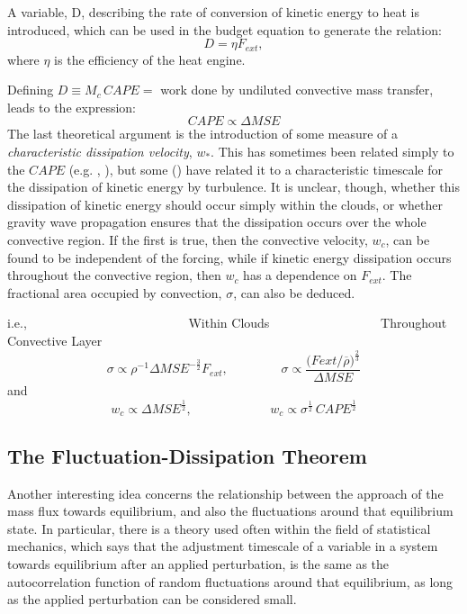 \documentclass[11pt,a4paper]{article}
\begin{document}
A variable, D, describing the rate of conversion of kinetic energy to
heat is introduced, which can be used in the budget equation to
generate the relation:
\begin{equation}
D = \eta F_{ext},
\end{equation}
where $\eta$ is the efficiency of the heat engine. 

Defining $D \equiv M_c \,CAPE = $ work done by undiluted convective mass
transfer, leads to the expression:
\begin{equation}
CAPE \propto \Delta MSE
\end{equation}  
The last theoretical argument is the introduction of some measure of a
\textit{characteristic dissipation velocity}, $w_*$. This has
sometimes been related simply to the $CAPE$ (e.g. \cite{craig}, \cite{emanuel}), but
some (\cite{shutts}) have related it to a characteristic timescale for the dissipation
of kinetic energy by turbulence. It is unclear, though,
whether this dissipation of kinetic energy should occur simply within
the clouds, or whether gravity wave propagation ensures that the
dissipation occurs over the whole convective region. If the first is
true, then the convective velocity, $w_c$, can be found to be independent of the forcing, while
if kinetic energy dissipation occurs throughout the convective region,
then $w_c$ has a dependence on $F_{ext}$. The fractional area occupied
by convection,
$\sigma$, can also be deduced. 

i.e., \ \ \ \ \ \ \ \ \ \ \ \ \ \ \ \ \ \ \ \ \ \ \ \ \ Within Clouds \ \
\ \ \ \ \ \ \ \ \ \ \ \ \ \ \ Throughout Convective Layer 
\begin{equation}
\sigma \propto \rho^{-1} {\Delta
MSE}^{-\frac{3}{2}} F_{ext} , \ \ \ \ \ \ \ \ \ \ \ \ \ \ \ \ \ \ \  \sigma \propto \frac{{(Fext/\overline{\rho}})^\frac{2}{3}} {\Delta
MSE}
\end{equation} 
and 
\begin{equation}
w_c \propto {\Delta MSE}^\frac{1}{2}, \ \ \ \ \ \ \ \
\ \ \ \ \ \ \ \ \ \ \ \ \ \ \ \ \ \ \ \ w_c \propto \sigma^\frac{1}{2} \, {CAPE}^\frac{1}{2}
\end{equation}

\subsection{The Fluctuation-Dissipation Theorem}
Another interesting idea concerns the relationship between the
approach of the mass flux towards equilibrium, and also the
fluctuations around that equilibrium state. In particular, there
is a theory used often within the field of statistical mechanics, which says that the
adjustment timescale of a variable in a system towards equilibrium
after an applied perturbation, is the same as the autocorrelation
function of random fluctuations around that equilibrium, as long as
the applied perturbation can be considered small.
\end{document}
